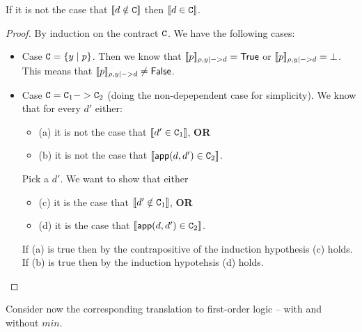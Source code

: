 \documentclass[preprint]{sigplanconf}
\begin{document}
\begin{lemma}\label{lem:in-notin}
If it is not the case that $[\![d \notin {\tt C}]\!]$ then $[\![d \in {\tt C}]\!]$.
\end{lemma}
\begin{proof}
By induction on the contract ${\tt C}$. We have the following cases:
\begin{itemize}
  \item Case ${\tt C} = \{ y \mid p \}$. Then we know that $[\![p]\!]_{\rho,y |-> d} = \mathsf{True}$
        or $[\![p]\!]_{\rho,y |-> d} = \bot$. This means that $[\![p]\!]_{\rho,y |-> d} \neq \mathsf{False}$.
  \item Case ${\tt C} = {\tt C}_1 -> {\tt C}_2$ (doing the non-depependent case for simplicity). We know that
        for every $d'$ either:
          \begin{itemize}
              \item (a) it is not the case that $[\![d' \in {\tt C}_1]\!]$, {\bf OR}
              \item (b) it is not the case that $[\![\mathsf{app}(d,d') \in {\tt C}_2]\!]$.
          \end{itemize}
        Pick a $d'$. We want to show that either
          \begin{itemize}
              \item (c) it is the case that $[\![d' \notin {\tt C}_1]\!]$, {\bf OR}
              \item (d) it is the case that $[\![\mathsf{app}(d,d') \in {\tt C}_2]\!]$.
          \end{itemize}
        If (a) is true then by the contrapositive of the induction hypothesis (c) holds.
        If (b) is true then by the induction hypotehsis (d) holds.
\end{itemize}
\end{proof}

Consider now the corresponding translation to first-order logic -- with and without $min$.
\end{document}
